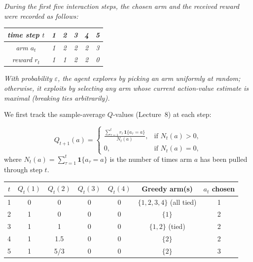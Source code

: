 \documentclass[12pt]{article}
\begin{document}
\textit{During the first five interaction steps, the chosen arm and the received reward were recorded as follows:}

\begin{center}
\begin{tabular}{c|ccccc}
\textit{time step $t$} & \textit{1} & \textit{2} & \textit{3} & \textit{4} & \textit{5} \\
\hline
\textit{arm $a_t$}     & \textit{1} & \textit{2} & \textit{2} & \textit{2} & \textit{3} \\
\textit{reward $r_t$}  & \textit{1} & \textit{1} & \textit{2} & \textit{2} & \textit{0}
\end{tabular}
\end{center}

\textit{With probability $\varepsilon$, the agent explores by picking an arm uniformly at random; otherwise, it exploits by selecting any arm whose current action-value estimate is maximal (breaking ties arbitrarily).}

\medskip

We first track the sample-average $Q$-values (Lecture~8) at each step:

\[
  Q_{t+1}(a) = \begin{cases}
    \displaystyle\frac{\sum_{\tau=1}^{t} r_\tau \,\mathbf{1}\{a_\tau = a\}}{N_t(a)}, & \text{if } N_t(a) > 0, \\[6pt]
    0, & \text{if } N_t(a) = 0,
  \end{cases}
\]
where $N_t(a) = \sum_{\tau=1}^{t} \mathbf{1}\{a_\tau = a\}$ is the number of times arm $a$ has been pulled through step $t$.

\begin{center}
\renewcommand{\arraystretch}{1.2}
\begin{tabular}{c|cccc|c|c}
\toprule
$t$ & $Q_t(1)$ & $Q_t(2)$ & $Q_t(3)$ & $Q_t(4)$ & Greedy arm(s) & $a_t$ chosen \\
\midrule
1 & 0     & 0     & 0     & 0     & $\{1,2,3,4\}$ (all tied) & 1 \\
2 & 1     & 0     & 0     & 0     & $\{1\}$              & 2 \\
3 & 1     & 1     & 0     & 0     & $\{1, 2\}$ (tied)    & 2 \\
4 & 1     & 1.5   & 0     & 0     & $\{2\}$              & 2 \\
5 & 1     & 5/3   & 0     & 0     & $\{2\}$              & 3 \\
\bottomrule
\end{tabular}
\end{center}
\end{document}
